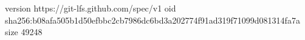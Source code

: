 version https://git-lfs.github.com/spec/v1
oid sha256:b08afa505b1d50efbbc2cb7986dc6bd3a202774f91ad319f71099d081314fa7a
size 49248

